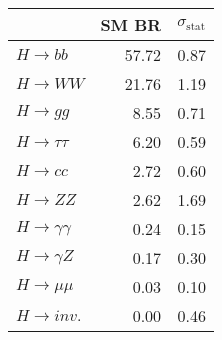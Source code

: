 \begin{tabular}{lrr}
\toprule
{} &  SM BR &  $\sigma_{\mathrm{stat}}$ \\
\midrule
$H \to bb$            &  57.72 &                      0.87 \\
$H \to WW$            &  21.76 &                      1.19 \\
$H \to gg$            &   8.55 &                      0.71 \\
$H \to \tau \tau$     &   6.20 &                      0.59 \\
$H \to cc$            &   2.72 &                      0.60 \\
$H \to ZZ$            &   2.62 &                      1.69 \\
$H \to \gamma \gamma$ &   0.24 &                      0.15 \\
$H \to \gamma Z$      &   0.17 &                      0.30 \\
$H \to \mu \mu$       &   0.03 &                      0.10 \\
$H \to inv.$          &   0.00 &                      0.46 \\
\bottomrule
\end{tabular}
